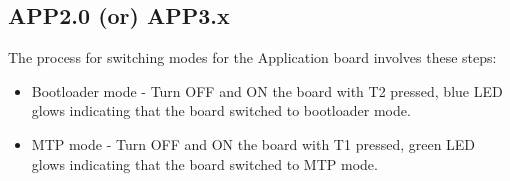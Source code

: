 \documentclass{article}
\begin{document}
\subsection{APP2.0 (or) APP3.x}
The process for switching modes for the Application board involves these steps:
\begin{itemize}
	\item Bootloader mode - Turn OFF and ON the board with T2 pressed, blue LED glows indicating that the board switched to bootloader mode.
	\item MTP mode - Turn OFF and ON the board with T1 pressed, green LED glows indicating that the board switched to MTP mode.
\end{itemize}
\end{document}
